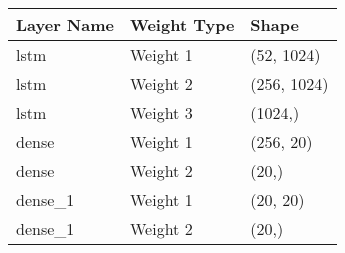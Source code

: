 \begin{tabular}{lll}
\toprule
Layer Name & Weight Type & Shape \\
\midrule
lstm & Weight 1 & (52, 1024) \\
lstm & Weight 2 & (256, 1024) \\
lstm & Weight 3 & (1024,) \\
dense & Weight 1 & (256, 20) \\
dense & Weight 2 & (20,) \\
dense_1 & Weight 1 & (20, 20) \\
dense_1 & Weight 2 & (20,) \\
\bottomrule
\end{tabular}
